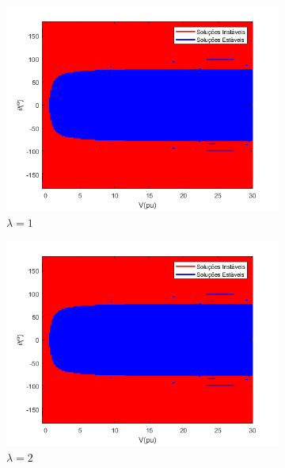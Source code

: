 \clearpage
\begin{figure}[H]
    \centering
    \caption{Mapa Fractal FPPOL - IEEE 33 Barras}
    \begin{subfigure}[b]{0.45\textwidth}
        \centering
        \includegraphics[width=\textwidth]{textuais/capitulo4/figuras/33_FP_POL_NOM.png}
        \caption{$\lambda=1$}
    \end{subfigure}
    \vfill
    \begin{subfigure}[b]{0.45\textwidth}
        \centering
        \includegraphics[width=\textwidth]{textuais/capitulo4/figuras/33_FP_POL_2lambda.png}
        \caption{$\lambda=2$}
    \end{subfigure}
    \vfill
    \begin{subfigure}[b]{0.45\textwidth}

\end{subfigure}
\end{figure}
